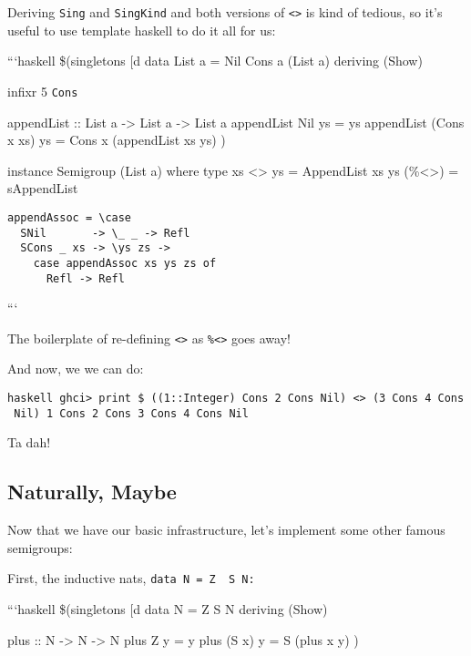 \documentclass[]{article}
\begin{document}
Deriving \texttt{Sing} and \texttt{SingKind} and both versions of
\texttt{\textless{}\textgreater{}} is kind of tedious, so it's useful to use
template haskell to do it all for us:

```haskell \$(singletons {[}d\textbar{} data List a = Nil \textbar{} Cons a
(List a) deriving (Show)

infixr 5 \texttt{Cons}

appendList :: List a -\textgreater{} List a -\textgreater{} List a appendList
Nil ys = ys appendList (Cons x xs) ys = Cons x (appendList xs ys) \textbar{}{]})

instance Semigroup (List a) where type xs \textless{}\textgreater{} ys =
AppendList xs ys (\%\textless{}\textgreater{}) = sAppendList

\begin{verbatim}
appendAssoc = \case
  SNil       -> \_ _ -> Refl
  SCons _ xs -> \ys zs ->
    case appendAssoc xs ys zs of
      Refl -> Refl
\end{verbatim}

```

The boilerplate of re-defining \texttt{\textless{}\textgreater{}} as
\texttt{\%\textless{}\textgreater{}} goes away!

And now, we we can do:

\texttt{haskell\ ghci\textgreater{}\ print\ \$\ ((1::Integer)\ \textasciigrave{}Cons\textasciigrave{}\ 2\ \textasciigrave{}Cons\textasciigrave{}\ Nil)\ \textless{}\textgreater{}\ (3\ \textasciigrave{}Cons\textasciigrave{}\ 4\ \textasciigrave{}Cons\textasciigrave{}\ Nil)\ 1\ \textasciigrave{}Cons\textasciigrave{}\ 2\ \textasciigrave{}Cons\textasciigrave{}\ 3\ \textasciigrave{}Cons\textasciigrave{}\ 4\ \textasciigrave{}Cons\textasciigrave{}\ Nil}

Ta dah!

\subsection{Naturally, Maybe}

Now that we have our basic infrastructure, let's implement some other famous
semigroups:

First, the inductive nats, \texttt{data\ N\ =\ Z\ \textbar{}\ S\ N:}

```haskell \$(singletons {[}d\textbar{} data N = Z \textbar{} S N deriving
(Show)

plus :: N -\textgreater{} N -\textgreater{} N plus Z y = y plus (S x) y = S
(plus x y) \textbar{}{]})
\end{document}
